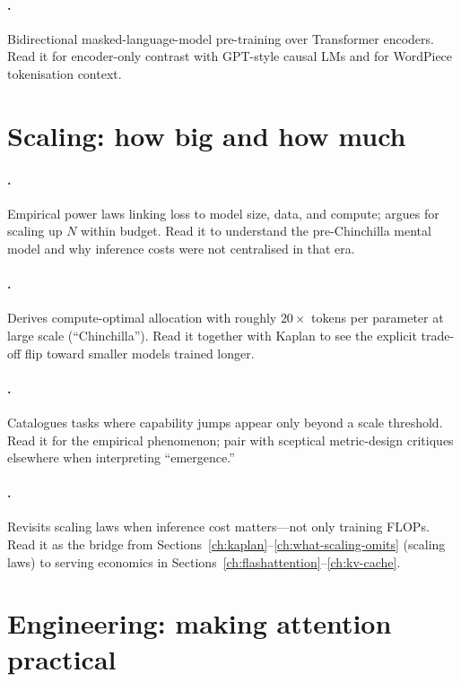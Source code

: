 \paragraph{\citet{devlin2019bert}.}
Bidirectional masked-language-model pre-training over Transformer encoders.
Read it for encoder-only contrast with GPT-style causal LMs and for WordPiece
tokenisation context.

\section*{Scaling: how big and how much}

\paragraph{\citet{kaplan2020scaling}.}
Empirical power laws linking loss to model size, data, and compute; argues for
scaling up \(N\) within budget. Read it to understand the pre-Chinchilla mental
model and why inference costs were not centralised in that era.

\paragraph{\citet{hoffmann2022training}.}
Derives compute-optimal allocation with roughly \(20\times\) tokens per
parameter at large scale (``Chinchilla''). Read it together with Kaplan to see
the explicit trade-off flip toward smaller models trained longer.

\paragraph{\citet{wei2022emergent}.}
Catalogues tasks where capability jumps appear only beyond a scale threshold.
Read it for the empirical phenomenon; pair with sceptical metric-design
critiques elsewhere when interpreting ``emergence.''

\paragraph{\citet{sardana2024beyond}.}
Revisits scaling laws when inference cost matters---not only training FLOPs.
Read it as the bridge from Sections~\ref{ch:kaplan}--\ref{ch:what-scaling-omits} (scaling laws) to serving economics in Sections~\ref{ch:flashattention}--\ref{ch:kv-cache}.

\section*{Engineering: making attention practical}


